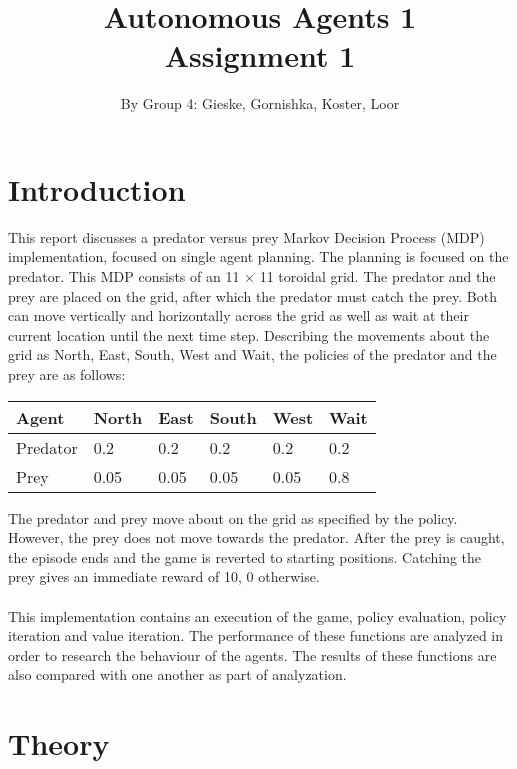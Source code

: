 \documentclass{article}
\begin{document}
\title{Autonomous Agents 1 \\ Assignment 1}

\author{By Group 4: Gieske, Gornishka, Koster, Loor}
\maketitle

\pagebreak

\section*{Introduction}
This report discusses a predator versus prey Markov Decision Process (MDP) implementation, focused on single agent planning. The planning is focused on the predator. This MDP consists of an 11 $\times$ 11 toroidal grid. The predator and the prey are placed on the grid, after which the  predator must catch the prey. Both can move vertically and horizontally across the grid as well as wait at their current location until the next time step. Describing the movements about the grid as North, East, South, West and Wait, the policies of the predator and the prey are as follows:
\begin{center}
	\begin{tabular}{ | l | l | l | l | l | l |}
	Agent & North & East & South & West & Wait\\
	\hline
	Predator & 0.2 & 0.2 & 0.2 & 0.2 & 0.2 \\ 
	Prey & 0.05 & 0.05 & 0.05 & 0.05 & 0.8 \\
	\end{tabular}
\end{center}
The predator and prey move about on the grid as specified by the policy. However, the prey does not move towards the predator. After the prey is caught, the episode ends and the game is reverted to starting positions. Catching the prey gives an immediate reward of 10, 0 otherwise.
\\ \\
This implementation contains an execution of the game, policy evaluation, policy iteration and value iteration. The performance of these functions are analyzed in order to research the behaviour of the agents. The results of these functions are also compared with one another as part of analyzation.

\pagebreak

\section*{Theory}
\end{document}
